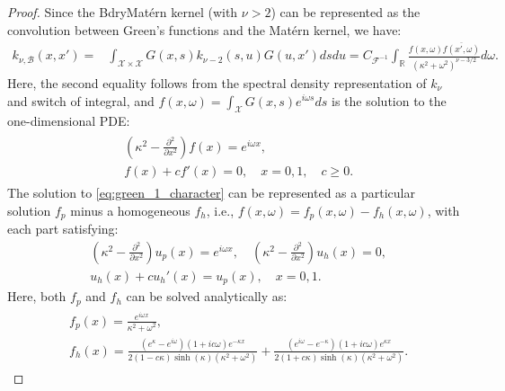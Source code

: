 \documentclass[aos,preprint]{imsart}
\theoremstyle{plain}
\newcommand{\Real}{\mathbb R}
\newcommand{\CalX}{\mathcal X}
\newcommand{\CalF}{\mathcal{F}}
\theoremstyle{remark}
\begin{document}
\begin{proof}
Since the BdryMat\'ern kernel (with $\nu > 2$) can be represented as the convolution between Green's functions and the Mat\'ern kernel, we have:
\begin{align}
    k_{\nu,\mathcal{B}}(x,x')=&\int_{\CalX\times\CalX}G(x,s)k_{\nu-2}(s,u)G(u,x')dsdu
    =C_{\CalF^{-1}}\int_\Real\frac{f(x,\omega)\overline{f(x',\omega)}}{(\kappa^2+\omega^2)^{\nu-3/2}}d\omega.
     \label{eq:kernel_green_1d}
\end{align}
Here, the second equality follows from the spectral density representation of $k_\nu$ and switch of integral, and $f(x,\omega)=\int_{\CalX}G(x,s)e^{i\omega s}ds$ is the solution to the one-dimensional PDE:
\begin{align}
\begin{split}
   & \left(\kappa^2-\frac{\partial^2}{\partial x^2}\right)f(x)=e^{i\omega x},\\
   &f(x)+cf'(x)=0,\quad x=0,1,\quad c\geq 0.
   \end{split}
\label{eq:green_1_character}
\end{align}
The solution to \eqref{eq:green_1_character} can be represented as a particular solution $f_p$ minus a homogeneous $f_h$, i.e., $f(x,\omega)=f_p(x,\omega)-f_h(x,\omega)$, with each part satisfying:
\begin{align*}
    &\left(\kappa^2-\frac{\partial^2}{\partial x^2}
    \right)u_p(x)=e^{i\omega x},\quad \left(\kappa^2-\frac{\partial^2}{\partial x^2}\right)u_h(x)=0,\\
   & u_h(x)+cu_h'(x)=u_p(x),\quad x=0,1.
\end{align*}
Here, both $f_p$ and $f_h$ can be solved analytically as:
\begin{align}
\begin{split}
    & f_p(x)=\frac{e^{i\omega x}}{\kappa^2+\omega^2},\\
    & f_h(x)=\frac{(e^\kappa-e^{i\omega})(1+ic\omega)e^{-\kappa x}}{2(1-c\kappa)\sinh(\kappa)(\kappa^2+\omega^2)}+\frac{(e^{i\omega}-e^{-\kappa})(1+ic\omega)e^{\kappa x}}{2(1+c\kappa)\sinh(\kappa)(\kappa^2+\omega^2)}.

\end{split}
\end{align}
\end{proof}
\end{document}
